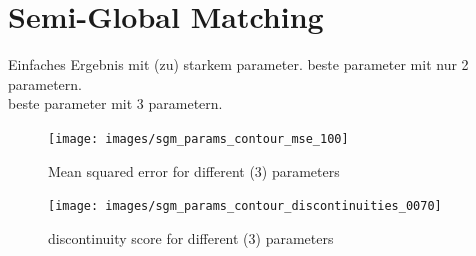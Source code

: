 \documentclass  [
  paper    = a4,
  BCOR     = 10mm,
  twoside,
  fontsize = 12pt,
  fleqn,
  toc      = bibnumbered,
  toc      = listofnumbered,
  numbers  = noendperiod,
  headings = normal,
  listof   = leveldown,
  version  = 3.03
]                                       {scrreprt}
\begin{document}
%
%




\section{Semi-Global Matching}
Einfaches Ergebnis mit (zu) starkem parameter.
beste parameter mit nur 2 parametern.\\
beste parameter mit 3 parametern.\\

\begin{figure}
	\centering
	\texttt{[image: images/sgm\_params\_contour\_mse\_100]}
	\caption[Mean squared error for different (3) parameters]{Mean squared error for different (3) parameters}
	\label{fig:sgmparamscontourmse100}
\end{figure}

\begin{figure}
	\centering
	\texttt{[image: images/sgm\_params\_contour\_discontinuities\_0070]}
	\caption[Discontinuity score for different (3) parameters]{discontinuity score for different (3) parameters}
	\label{fig:sgmparamscontourdis}
\end{figure}
\end{document}
